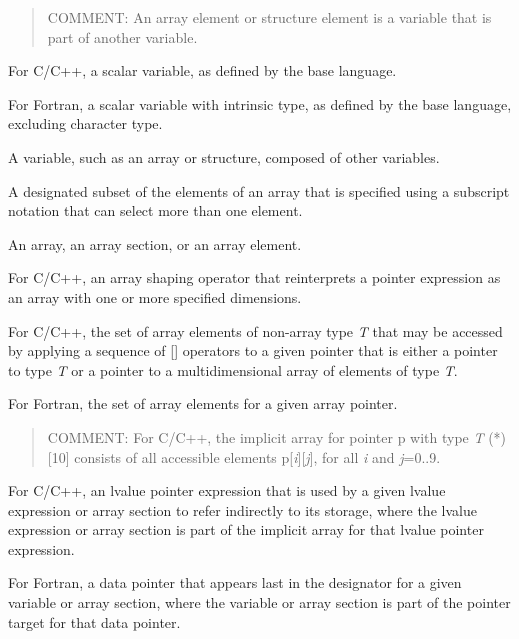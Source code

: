 \begin{quote}
COMMENT: An array element or structure element is a variable that is part of 
another variable.
\end{quote}
\glossarydefend

\glossarydefstart
For C/C++, a scalar variable, as defined by the base language.

For Fortran, a scalar variable with intrinsic type, as defined by 
the base language, excluding character type.
\glossarydefend

\glossarydefstart
A variable, such as an array or structure, composed of other variables.
\glossarydefend

\glossarydefstart
A designated subset of the elements of an array that is specified using a
subscript notation that can select more than one element.
\glossarydefend

\glossarydefstart
An array, an array section, or an array element.
\glossarydefend

\glossarydefstart
For C/C++, an array shaping operator that reinterprets a pointer expression as
an array with one or more specified dimensions.
\glossarydefend

\glossarydefstart
For C/C++, the set of array elements of non-array type \emph{T} that may be
accessed by applying a sequence of [] operators to a given pointer that is
either a pointer to type \emph{T} or a pointer to a multidimensional array of
elements of type \emph{T}.

For Fortran, the set of array elements for a given array pointer.
\begin{quote}
COMMENT: For C/C++, the implicit array for pointer p with type \emph{T} (*)[10] 
consists of all accessible elements p[\emph{i}][\emph{j}], for all 
\emph{i} and \emph{j}=0..9.
\end{quote}
\glossarydefend

\glossarydefstart
For C/C++, an lvalue pointer expression that is used by a given lvalue
expression or array section to refer indirectly to its storage, where
the lvalue expression or array section is part of the implicit array for that
lvalue pointer expression.

For Fortran, a data pointer that appears last in the designator for a given
variable or array section, where the variable or array section is part
of the pointer target for that data pointer.

